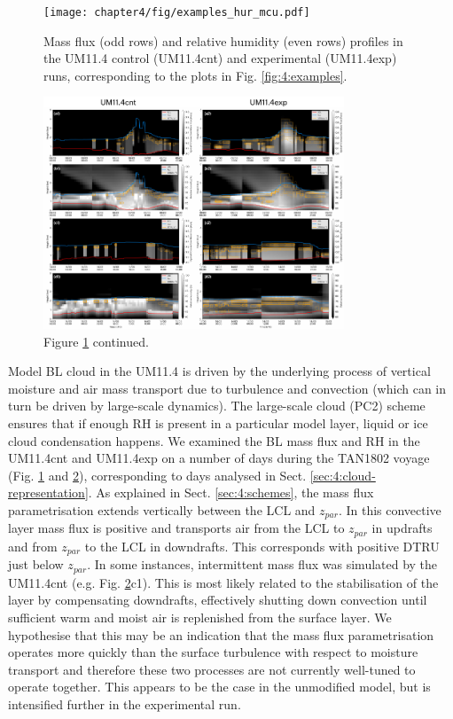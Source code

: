 \begin{figure}[p]
\centering
\texttt{[image: chapter4/fig/examples\_hur\_mcu.pdf]}
\caption[Mass flux and relative humidity profiles]{Mass flux (odd rows) and relative humidity (even rows) profiles in the UM11.4 control (UM11.4cnt)
and experimental (UM11.4exp) runs, corresponding to the plots in Fig. \ref{fig:4:examples}.
}
\label{fig:4:examples-hur-mcu}
\end{figure}

\begin{figure}[t]
\centering
\includegraphics[width=0.8\textwidth]{chapter4/fig/examples_hur_mcu_cont.pdf}
\caption{Figure \ref{fig:4:examples-hur-mcu} continued.
}
\label{fig:4:examples-hur-mcu-cont}
\end{figure}

Model BL cloud in the UM11.4 is driven by the underlying process
of vertical moisture and air mass transport due to turbulence and convection
(which can in turn be driven by large-scale dynamics). The large-scale cloud
(PC2) scheme ensures that if enough RH is present in a particular model
layer, liquid or ice cloud condensation happens. We examined the BL mass
flux and RH in the UM11.4cnt and UM11.4exp on a number of days during the TAN1802
voyage (Fig. \ref{fig:4:examples-hur-mcu} and \ref{fig:4:examples-hur-mcu-cont}),
corresponding to days analysed in Sect. \ref{sec:4:cloud-representation}.
As explained in Sect. \ref{sec:4:schemes}, the mass flux parametrisation
extends vertically between the LCL and $z_{par}$. In this convective layer mass
flux is positive and transports air from the LCL to $z_{par}$ in updrafts
and from $z_{par}$ to the LCL in downdrafts. 
This corresponds with positive
DTRU just below $z_{par}$. In some instances, intermittent mass flux was
simulated by the UM11.4cnt (e.g. Fig. \ref{fig:4:examples-hur-mcu-cont}c1). This
is most likely related to the stabilisation of the layer by compensating
downdrafts, effectively shutting down convection until sufficient warm
and moist air is replenished from the surface layer. We hypothesise that this
may be an indication that the mass flux parametrisation operates more quickly 
than the surface turbulence with respect to moisture transport and therefore these two processes are not currently well-tuned to operate together. This appears to be the case in the unmodified
model, but is intensified further in the experimental run.

